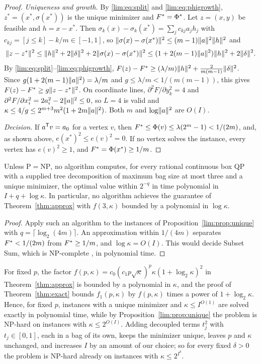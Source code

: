 \begin{proof}
\emph{Uniqueness and growth.} By \eqref{lim:eq:split} and
\eqref{lim:eq:phigrowth}, $z^*=(x^*,\sigma(x^*))$ is the unique minimizer
and $F^{*}=\Phi^*$. Let $z=(x,y)$ be feasible and $h=x-x^*$. Then
$\sigma_k(x)-\sigma_k(x^*)=\sum_jc_{kj}a_jh_j$ with
$c_{kj}=[j\le k]-k/m\in[-1,1]$, so
$\lVert \sigma(x)-\sigma(x^*)\rVert^2\le(m-1)\lVert a\rVert^2\lVert h\rVert^2$ and
\[
\lVert z-z^*\rVert^2\le\lVert h\rVert^2+2\lVert \delta\rVert^2+2\lVert \sigma(x)-\sigma(x^*)\rVert^2
\le(1+2(m-1)\lVert a\rVert^2)\lVert h\rVert^2+2\lVert \delta\rVert^2 .
\]
By \eqref{lim:eq:split}--\eqref{lim:eq:phigrowth},
$F(z)-F^{*}\ge(\lambda/m)\lVert h\rVert^2+\frac2{m(m-1)}\lVert \delta\rVert^2$. Since
$g(1+2(m-1)\lVert a\rVert^2)=\lambda/m$ and $g\le\lambda/m<1/(m(m-1))$, this gives
$F(z)-F^{*}\ge g\lVert z-z^*\rVert^2$. On coordinate lines,
$\partial^2F/\partial y_k^2=4$ and
$\partial^2F/\partial x_i^2=2a_i^2-2\lVert a\rVert^2\le0$, so $L=4$ is valid and
$\kappa\le4/g\le2^{m+3}m^2(1+2m\lVert a\rVert^2)$. Both $m$ and $\log\lVert a\rVert^2$ are
$O(I)$.

\emph{Decision.} If $a^{\mathsf T}v=a_0$ for a vertex $v$, then
$F^{*}\le\Phi(v)\le\lambda(2^m-1)<1/(2m)$, and, as shown above,
$e(x^*)^2\le e(v)^2=0$. If no vertex solves the instance, every vertex has
$e(v)^2\ge1$, and $F^{*}=\Phi(x^*)\ge1/m$.
\end{proof}

\begin{corollary}
\label{lim:cor:nopolylog}
Unless $\mathrm P=\mathrm{NP}$, no algorithm computes, for every rational
continuous box QP with a supplied tree decomposition of maximum bag size at
most three and a unique minimizer, the optimal value within $2^{-q}$ in time
polynomial in $I+q+\log\kappa$. In particular, no algorithm achieves the
guarantee of Theorem~\ref{thm:approx} with $f(3,\kappa)$ bounded by a
polynomial in $\log\kappa$.
\end{corollary}

\begin{proof}
Apply such an algorithm to the instances of
Proposition~\ref{lim:prop:unique} with $q=\lceil\log_2(4m)\rceil$. An
approximation within $1/(4m)$ separates $F^{*}<1/(2m)$ from $F^{*}\ge1/m$,
and $\log\kappa=O(I)$. This would decide Subset Sum, which is NP-complete
\cite{GareyJohnson1979}, in polynomial time.
\end{proof}

For fixed $p$, the factor
$f(p,\kappa)=c_0(c_1p\sqrt\kappa)^p\kappa(1+\log_2\kappa)^2$ in
Theorem~\ref{thm:approx} is bounded by a polynomial in $\kappa$, and the proof
of Theorem~\ref{thm:exact} bounds $f_1(p,\kappa)$ by $f(p,\kappa)$ times a
power of $1+\log_2\kappa$. Hence, for fixed $p$, instances with a unique
minimizer and $\kappa\le I^{O(1)}$ are solved exactly in polynomial time,
while by Proposition~\ref{lim:prop:unique} the problem is NP-hard on
instances with $\kappa\le2^{O(I)}$. Adding decoupled terms $t_j^2$ with
$t_j\in[0,1]$, each in a bag of its own, keeps the minimizer unique, leaves
$p$ and $\kappa$ unchanged, and increases $I$ by an amount of our choice; so
for every fixed $\delta>0$ the problem is NP-hard already on instances with
$\kappa\le2^{I^\delta}$.

